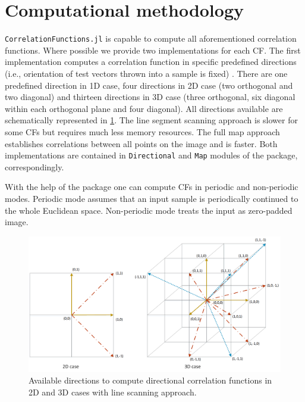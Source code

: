\documentclass[1p]{elsarticle}
\newcommand{\code}[1]{\colorbox{light-gray}{\texttt{#1}}}
\begin{document}
\section{Computational methodology}
\code{CorrelationFunctions.jl} is capable to compute all aforementioned
correlation functions. Where possible we provide two implementations for each
CF. The first implementation computes a correlation function in specific
predefined directions (i.e., orientation of test vectors thrown into a sample is
fixed) \cite{jiao2014chawla,EPL1}.  There are one predefined direction in 1D
case, four directions in 2D case (two orthogonal and two diagonal) and thirteen
directions in 3D case (three orthogonal, six diagonal within each orthogonal
plane and four diagonal). All directions available are schematically represented
in \cref{fig:directions}. The line segment scanning approach is slower for some
CFs but requires much less memory resources. The full map approach establishes
correlations between all points on the image and is faster. Both implementations
are contained in \code{Directional} and \code{Map} modules of the package,
correspondingly.

With the help of the package one can compute CFs in periodic and non-periodic
modes.  Periodic mode assumes that an input sample is periodically continued to
the whole Euclidean space. Non-periodic mode treats the input as zero-padded image.

\begin{figure}[ht]
  \centering
  \includegraphics[width=0.9\linewidth]{images/cf_diag.png}
  \caption[]{Available directions to compute directional correlation functions
    in 2D and 3D cases with line scanning approach.}
  \label{fig:directions}
\end{figure}
\end{document}
